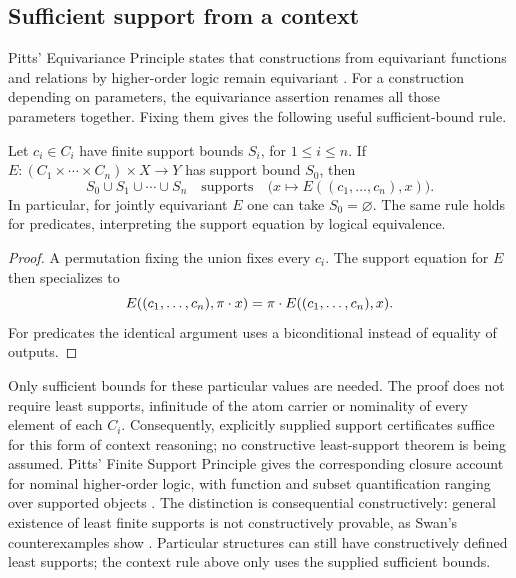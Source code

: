 \subsection{Sufficient support from a context}
\label{sec:function-context-support}

Pitts' Equivariance Principle states that constructions from equivariant
functions and relations by higher-order logic remain equivariant
\cite[Proposition~1.9 and following principle, p.~21]{pitts2013}.
For a construction depending on parameters, the equivariance assertion
renames all those parameters together. Fixing them gives the following
useful sufficient-bound rule.

\begin{proposition}
\label{prop:function-context-support}
Let $c_i\in C_i$ have finite support bounds $S_i$, for $1\leq i\leq n$.
If $E:(C_1\times\cdots\times C_n)\times X\to Y$ has support bound
$S_0$, then
\[
  S_0\cup S_1\cup\cdots\cup S_n
  \quad\text{supports}\quad
  \bigl(x\mapsto E((c_1,\ldots,c_n),x)\bigr).
\]
In particular, for jointly equivariant $E$ one can take $S_0=\varnothing$.
The same rule holds for predicates, interpreting the support equation
by logical equivalence.
\end{proposition}

\begin{proof}
A permutation fixing the union fixes every $c_i$. The support equation
for $E$ then specializes to
\[
  E((c_1,\ldots,c_n),\pi\mathbin{\cdot} x)
    =\pi\mathbin{\cdot} E((c_1,\ldots,c_n),x).
\]
For predicates the identical argument uses a biconditional instead of
equality of outputs.
\end{proof}

Only sufficient bounds for these particular values are needed. The proof
does not require least supports, infinitude of the atom carrier or
nominality of every element of each $C_i$. Consequently, explicitly
supplied support certificates suffice for this form of context reasoning;
no constructive least-support theorem is being assumed. Pitts' Finite
Support Principle gives the corresponding closure account for nominal
higher-order logic, with function and subset quantification ranging over
supported objects \cite[Section~2.5, pp.~39--40]{pitts2013}.
The distinction is consequential constructively: general existence of least
finite supports is not constructively provable, as Swan's counterexamples
show \cite[Theorem~3.5]{swan2017}. Particular structures can still have
constructively defined least supports; the context rule above only uses
the supplied sufficient bounds.

